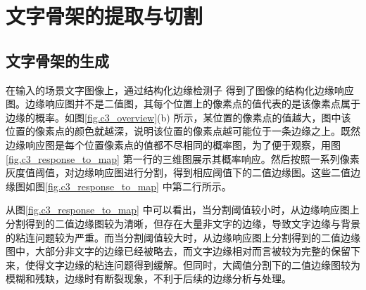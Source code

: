     \section{文字骨架的提取与切割}

        \subsection{文字骨架的生成}
        \label{sec.c3_skeleton}


        在输入的场景文字图像上，通过结构化边缘检测子\cite{Dollar2015Fast} 得到了图像的结构化边缘响应图。边缘响应图并不是二值图，其每个位置上的像素点的值代表的是该像素点属于边缘的概率。如图\ref{fig.c3_overview}(b) 所示，某位置的像素点的值越大，图中该位置的像素点的颜色就越深，说明该位置的像素点越可能位于一条边缘之上。既然边缘响应图是每个位置像素点的值都不尽相同的概率图，为了便于观察，用图\ref{fig.c3_response_to_map} 第一行的三维图展示其概率响应。然后按照一系列像素灰度值阈值，对边缘响应图进行分割，得到相应阈值下的二值边缘图。这些二值边缘图如图\ref{fig.c3_response_to_map} 中第二行所示。

        从图\ref{fig.c3_response_to_map} 中可以看出，当分割阈值较小时，从边缘响应图上分割得到的二值边缘图较为清晰，但存在大量非文字的边缘，导致文字边缘与背景的粘连问题较为严重。而当分割阈值较大时，从边缘响应图上分割得到的二值边缘图中，大部分非文字的边缘已经被略去，而文字边缘相对而言被较为完整的保留下来，使得文字边缘的粘连问题得到缓解。但同时，大阈值分割下的二值边缘图较为模糊和残缺，边缘时有断裂现象，不利于后续的边缘分析与处理。

